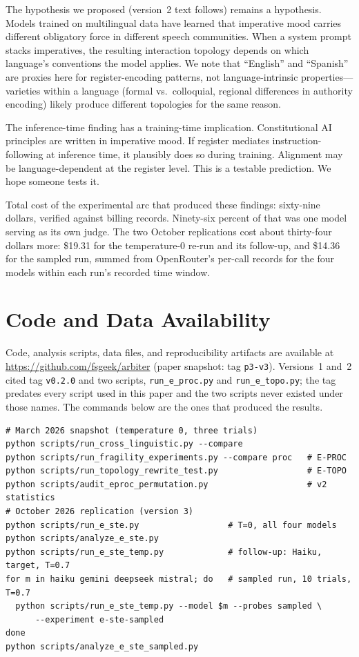 \documentclass[11pt,a4paper]{article}
\begin{document}
The hypothesis we proposed (version~2 text follows) remains a
hypothesis. Models trained on multilingual data
have learned that imperative mood carries different obligatory force
in different speech communities. When a system prompt stacks
imperatives, the resulting interaction topology depends on which
language's conventions the model applies. We note that ``English''
and ``Spanish'' are proxies here for register-encoding patterns, not
language-intrinsic properties---varieties within a language (formal
vs.\ colloquial, regional differences in authority encoding) likely
produce different topologies for the same reason.

The inference-time finding has a training-time implication.
Constitutional AI principles are written in imperative mood. If
register mediates instruction-following at inference time, it
plausibly does so during training. Alignment may be
language-dependent at the register level. This is a testable
prediction. We hope someone tests it.

Total cost of the experimental arc that produced these findings:
sixty-nine dollars, verified against billing records. Ninety-six
percent of that was one model serving as its own judge. The two
October replications cost about thirty-four dollars more: \$19.31 for
the temperature-0 re-run and its follow-up, and \$14.36 for the
sampled run, summed from OpenRouter's per-call records for the four
models within each run's recorded time window.

\section{Code and Data Availability}
\label{sec:availability}

Code, analysis scripts, data files, and reproducibility artifacts are
available at
\url{https://github.com/fsgeek/arbiter} (paper snapshot: tag
\texttt{p3-v3}). Versions~1 and~2 cited tag \texttt{v0.2.0} and two
scripts, \texttt{run\_e\_proc.py} and \texttt{run\_e\_topo.py}; the
tag predates every script used in this paper and the two scripts never
existed under those names. The commands below are the ones that
produced the results.

\begin{verbatim}
# March 2026 snapshot (temperature 0, three trials)
python scripts/run_cross_linguistic.py --compare
python scripts/run_fragility_experiments.py --compare proc   # E-PROC
python scripts/run_topology_rewrite_test.py                  # E-TOPO
python scripts/audit_eproc_permutation.py                    # v2 statistics
# October 2026 replication (version 3)
python scripts/run_e_ste.py                  # T=0, all four models
python scripts/analyze_e_ste.py
python scripts/run_e_ste_temp.py             # follow-up: Haiku, target, T=0.7
for m in haiku gemini deepseek mistral; do   # sampled run, 10 trials, T=0.7
  python scripts/run_e_ste_temp.py --model $m --probes sampled \
      --experiment e-ste-sampled
done
python scripts/analyze_e_ste_sampled.py
\end{verbatim}


\end{document}
